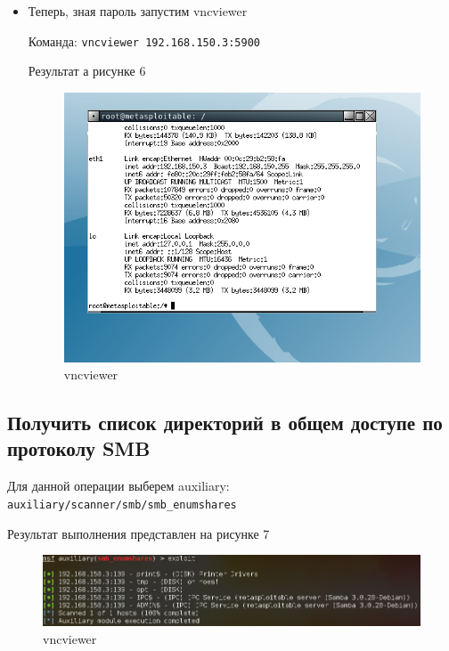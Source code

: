 \documentclass[11pt, a4paper]{article}		%
\begin{document}
\begin{itemize}
\item Теперь, зная пароль запустим vncviewer

Команда: \verb'vncviewer 192.168.150.3:5900'

Результат а рисунке 6

\begin{figure}[h!]
\centering
\includegraphics[scale=0.8]{res/vncviewer}
\caption{vncviewer}
\end{figure}


\end{itemize}



\subsection{Получить список директорий в общем доступе по протоколу SMB}

Для данной операции выберем auxiliary: \verb'auxiliary/scanner/smb/smb_enumshares'

Результат выполнения представлен на рисунке 7

\begin{figure}[h!]
\centering
\includegraphics[scale=0.8]{res/smb_auxiliary}
\caption{vncviewer}
\end{figure}
\end{document}
